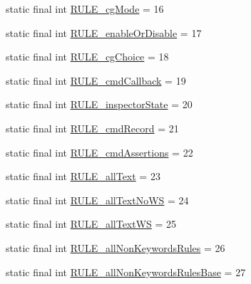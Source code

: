 \begin{DoxyCompactItemize}
static final int \hyperlink{classgov_1_1nasa_1_1jpf_1_1inspector_1_1client_1_1parser_1_1_console_grammar_parser_aff9cdfa31bbb232d21adea605f1a0615}{R\+U\+L\+E\+\_\+cg\+Mode} = 16
\item 
static final int \hyperlink{classgov_1_1nasa_1_1jpf_1_1inspector_1_1client_1_1parser_1_1_console_grammar_parser_a7dba074eb09308de4fb99d34a15923ec}{R\+U\+L\+E\+\_\+enable\+Or\+Disable} = 17
\item 
static final int \hyperlink{classgov_1_1nasa_1_1jpf_1_1inspector_1_1client_1_1parser_1_1_console_grammar_parser_addd65ad3cc6d7379a2a88ca83408524e}{R\+U\+L\+E\+\_\+cg\+Choice} = 18
\item 
static final int \hyperlink{classgov_1_1nasa_1_1jpf_1_1inspector_1_1client_1_1parser_1_1_console_grammar_parser_a084430d36c0c1023870b5d273c2c71d3}{R\+U\+L\+E\+\_\+cmd\+Callback} = 19
\item 
static final int \hyperlink{classgov_1_1nasa_1_1jpf_1_1inspector_1_1client_1_1parser_1_1_console_grammar_parser_af89fe3050b5d928a325e0550926380a1}{R\+U\+L\+E\+\_\+inspector\+State} = 20
\item 
static final int \hyperlink{classgov_1_1nasa_1_1jpf_1_1inspector_1_1client_1_1parser_1_1_console_grammar_parser_ad803493ba668c8a5273f286630b621c7}{R\+U\+L\+E\+\_\+cmd\+Record} = 21
\item 
static final int \hyperlink{classgov_1_1nasa_1_1jpf_1_1inspector_1_1client_1_1parser_1_1_console_grammar_parser_a4e8c3b6c02bd3ba2bdc1856db59019f5}{R\+U\+L\+E\+\_\+cmd\+Assertions} = 22
\item 
static final int \hyperlink{classgov_1_1nasa_1_1jpf_1_1inspector_1_1client_1_1parser_1_1_console_grammar_parser_aa8c1d0e6cac5263017b495d15cc8c953}{R\+U\+L\+E\+\_\+all\+Text} = 23
\item 
static final int \hyperlink{classgov_1_1nasa_1_1jpf_1_1inspector_1_1client_1_1parser_1_1_console_grammar_parser_a68293b6c2fe0d1e66e761c60d0610a0b}{R\+U\+L\+E\+\_\+all\+Text\+No\+WS} = 24
\item 
static final int \hyperlink{classgov_1_1nasa_1_1jpf_1_1inspector_1_1client_1_1parser_1_1_console_grammar_parser_aebe224edc14605dc6d31b6c5a623677b}{R\+U\+L\+E\+\_\+all\+Text\+WS} = 25
\item 
static final int \hyperlink{classgov_1_1nasa_1_1jpf_1_1inspector_1_1client_1_1parser_1_1_console_grammar_parser_afffc9dd7e2596f92d0f3f88a4b590436}{R\+U\+L\+E\+\_\+all\+Non\+Keywords\+Rules} = 26
\item 
static final int \hyperlink{classgov_1_1nasa_1_1jpf_1_1inspector_1_1client_1_1parser_1_1_console_grammar_parser_a9c41f563ceb76545bcd8feeaa195082b}{R\+U\+L\+E\+\_\+all\+Non\+Keywords\+Rules\+Base} = 27

\end{DoxyCompactItemize}
